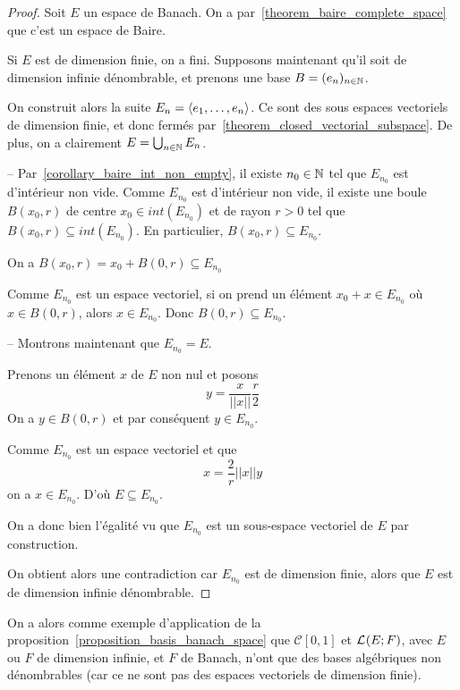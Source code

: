 \ifdefined\outputproof
\begin{proof}
	Soit $E$ un espace de Banach. On a
	par~\ref{theorem_baire_complete_space} que c'est un espace de Baire.

	Si $E$ est de dimension finie, on a fini.
	Supposons maintenant qu'il soit de dimension infinie dénombrable, et prenons
	une base $B = (e_{n})_{n \in \mathbb{N}}$.

	On construit alors la suite $E_{n} = \left<e_{1}, \ldots, e_{n}\right>$. Ce sont des
	sous espaces vectoriels de dimension finie, et donc fermés
	par~\ref{theorem_closed_vectorial_subspace}. De plus, on a
	clairement $E = \bigcup_{n \in \mathbb{N}} E_{n}$.

	-- Par~\ref{corollary_baire_int_non_empty}, il existe $n_{0} \in \mathbb{N}$ tel que $E_{n_{0}}$ est d'intérieur non
	vide.
	Comme $E_{n_{0}}$ est d'intérieur non vide, il existe une
	boule $B(x_{0}, r)$ de centre $x_{0} \in int({E_{n_{0}}})$ et de rayon $r > 0$ tel que
	$B(x_{0}, r) \subseteq int(E_{n_{0}})$. En particulier, $B(x_{0}, r)
	\subseteq E_{n_{0}}$.
	
	On a $B(x_{0}, r) = x_{0} + B(0, r) \subseteq
	E_{n_{0}}$

	Comme $E_{n_{0}}$ est un espace vectoriel, si on prend un
	élément $x_{0} + x \in E_{n_{0}}$ où $x \in B(0, r)$, alors $x \in E_{n_{0}}$.
	Donc $B(0, r) \subseteq E_{n_{0}}$.

	-- Montrons maintenant que $E_{n_{0}} = E$.

	Prenons un élément $x$ de $E$ non nul et posons
	\begin{equation}
		y = \frac{x}{||x||} \frac{r}{2}
	\end{equation}
	On a $y \in B(0, r)$ et par conséquent $y \in E_{n_{0}}$.
	
	Comme $E_{n_{0}}$ est un espace vectoriel et que 
	\begin{equation}
		x = \frac{2}{r} ||x|| y
	\end{equation}
	on a $x \in E_{n_{0}}$. D'où $E \subseteq E_{n_{0}}$.
	
	On a donc bien l'égalité vu que $E_{n_{0}}$ est un sous-espace vectoriel de
	$E$ par construction.

	On obtient alors une contradiction car $E_{n_{0}}$ est de dimension finie,
	alors que $E$ est de dimension infinie dénombrable.
\end{proof}
\fi

On a alors comme exemple d'application de la
proposition~\ref{proposition_basis_banach_space} que $\mathcal{C}[0, 1]$ et
$\mathcal{L}_{}(E; F)$, avec $E$ ou $F$ de dimension infinie, et $F$ de Banach,
n'ont que des bases algébriques non dénombrables (car ce ne sont pas des espaces
vectoriels de dimension finie).

